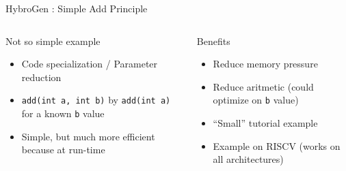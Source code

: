 \begin{Frame}{HybroGen : Simple Add Principle}
 \begin{columns}[t]
  \begin{column}{\BW}
    \begin{block}{Not so simple example}
      \begin{itemize}
        \item Code specialization / Parameter reduction
        \item \texttt{add(int a, int b)} by \texttt{add(int a)}  for a
          known \texttt{b} value
        \item Simple, but much more efficient because at run-time
      \end{itemize}
    \end{block}
  \end{column}
  \begin{column}{\BW}
    \begin{block}{Benefits}
          \begin{itemize}
          \item Reduce memory pressure
          \item Reduce aritmetic (could optimize on \texttt{b} value)
          \item ``Small'' tutorial example
          \item Example on RISCV (works on all architectures)
          \end{itemize}
    \end{block}
  \end{column}

 \end{columns}
\end{Frame}
